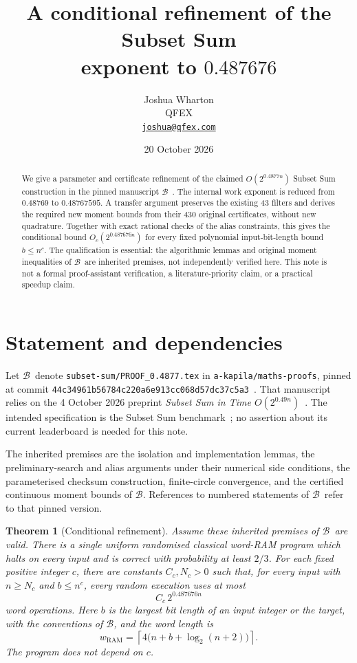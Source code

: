 \documentclass[11pt,a4paper]{article}
\title{A conditional refinement of the Subset Sum\texorpdfstring{\\}{ }exponent to \texorpdfstring{$0.487676$}{0.487676}}
\author{Joshua Wharton\\[0.4em]\small QFEX\\[0.2em]\small\href{mailto:joshua@qfex.com}{\texttt{joshua@qfex.com}}}
\date{20 October 2026}
\newtheorem{theorem}{Theorem}
\theoremstyle{remark}
\newcommand{\Base}{\ensuremath{\mathcal{B}}}
\newcommand{\logtwo}{\log_2}
\begin{document}
\maketitle

\begin{abstract}
We give a parameter and certificate refinement of the claimed
$O(2^{0.4877n})$ Subset Sum construction in the pinned manuscript
\Base~\cite{baseline}. The internal work exponent is reduced from
$0.48769$ to $0.48767595$. A transfer argument preserves the existing
43 filters and derives the required new moment bounds from their
430 original certificates, without new quadrature. Together with exact
rational checks of the alias constraints, this gives the conditional
bound $O_c(2^{0.487676n})$ for every fixed polynomial input-bit-length
bound $b\le n^c$. The qualification is essential: the algorithmic lemmas
and original moment inequalities of \Base\ are inherited premises, not
independently verified here. This note is not a formal proof-assistant
verification, a literature-priority claim, or a practical speedup claim.
\end{abstract}

\section{Statement and dependencies}
\label{sec:statement}

Let \Base\ denote \texttt{subset-sum/PROOF\_0.4877.tex} in
\texttt{a-kapila/maths-proofs}, pinned at commit
\texttt{44c34961b56784c220a6e913cc068d57dc37c5a3}~\cite{baseline}.
That manuscript relies on the 4 October 2026 preprint
\emph{Subset Sum in Time $O(2^{0.49n})$}~\cite{original}.
The intended specification is the Subset Sum benchmark~\cite{benchmark};
no assertion about its current leaderboard is needed for this note.

The inherited premises are the isolation and implementation lemmas,
the preliminary-search and alias arguments under their numerical side
conditions, the parameterised checksum construction, finite-circle
convergence, and the certified continuous moment bounds of \Base.
References to numbered statements of \Base\ refer to that pinned version.

\begin{theorem}[Conditional refinement]
\label{thm:main}
Assume these inherited premises of \Base\ are valid. There is a single
uniform randomised classical word-RAM program which halts on every input
and is correct with probability at least $2/3$. For each fixed positive
integer $c$, there are constants $C_c,N_c>0$ such that, for every input
with $n\ge N_c$ and $b\le n^c$, every random execution uses at most
\[
 C_c\,2^{0.487676n}
\]
word operations. Here $b$ is the largest bit length of an input integer
or the target, with the conventions of \Base, and the word length is
\[
 w_{\mathrm{RAM}}=\left\lceil4\bigl(n+b+\logtwo(n+2)\bigr)\right\rceil.
\]
The program does not depend on $c$.
\end{theorem}
\end{document}
